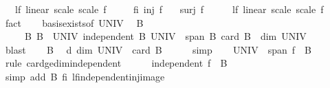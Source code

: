 \begin{isabellebody}
\ \ \ lf{\isacharcolon}{\kern0pt}\ {\isachardoublequoteopen}linear\ scale\ scale\ f{\isachardoublequoteclose}\isanewline
\ \ \ \ \ fi{\isacharcolon}{\kern0pt}\ {\isachardoublequoteopen}inj\ f{\isachardoublequoteclose}\isanewline
\ \ \ {\isachardoublequoteopen}surj\ f{\isachardoublequoteclose}\isanewline
%
\isadelimproof
%
\endisadelimproof
%
\isatagproof
{}\isamarkupfalse%
\ {\isacharminus}{\kern0pt}\isanewline
\ \ \isamarkupfalse%
\ lf{\isacharcolon}{\kern0pt}\ linear\ scale\ scale\ f\ \isamarkupfalse%
\ fact\isanewline
\ \ \isamarkupfalse%
\ basis{\isacharunderscore}{\kern0pt}exists{\isacharbrackleft}{\kern0pt}of\ UNIV{\isacharbrackright}{\kern0pt}\ \isamarkupfalse%
\ B\isanewline
\ \ \ \ \ B{\isacharcolon}{\kern0pt}\ {\isachardoublequoteopen}B\ {\isasymsubseteq}\ UNIV{\isachardoublequoteclose}\ {\isachardoublequoteopen}independent\ B{\isachardoublequoteclose}\ {\isachardoublequoteopen}UNIV\ {\isasymsubseteq}\ span\ B{\isachardoublequoteclose}\ {\isachardoublequoteopen}card\ B\ {\isacharequal}{\kern0pt}\ dim\ UNIV{\isachardoublequoteclose}\isanewline
\ \ \ \ \isamarkupfalse%
\ blast\isanewline
\ \ \isamarkupfalse%
\ B{\isacharparenleft}{\kern0pt}{}{\isacharparenright}{\kern0pt}\ \isamarkupfalse%
\ d{\isacharcolon}{\kern0pt}\ {\isachardoublequoteopen}dim\ UNIV\ {\isacharequal}{\kern0pt}\ card\ B{\isachardoublequoteclose}\isanewline
\ \ \ \ \isamarkupfalse%
\ simp\isanewline
\ \ \isamarkupfalse%
\ {\isachardoublequoteopen}UNIV\ {\isasymsubseteq}\ span\ {\isacharparenleft}{\kern0pt}f\ {\isacharbackquote}{\kern0pt}\ B{\isacharparenright}{\kern0pt}{\isachardoublequoteclose}\isanewline
\ \ \isamarkupfalse%
\ {\isacharparenleft}{\kern0pt}rule\ card{\isacharunderscore}{\kern0pt}ge{\isacharunderscore}{\kern0pt}dim{\isacharunderscore}{\kern0pt}independent{\isacharparenright}{\kern0pt}\isanewline
\ \ \ \ \isamarkupfalse%
\ {\isachardoublequoteopen}independent\ {\isacharparenleft}{\kern0pt}f\ {\isacharbackquote}{\kern0pt}\ B{\isacharparenright}{\kern0pt}{\isachardoublequoteclose}\isanewline
\ \ \ \ \ \ \isamarkupfalse%
\ {\isacharparenleft}{\kern0pt}simp\ add{\isacharcolon}{\kern0pt}\ B{\isacharparenleft}{\kern0pt}{}{\isacharparenright}{\kern0pt}\ fi\ lf{\isachardot}{\kern0pt}independent{\isacharunderscore}{\kern0pt}inj{\isacharunderscore}{\kern0pt}image{\isacharparenright}{\kern0pt}\isanewline

\end{isabellebody}
